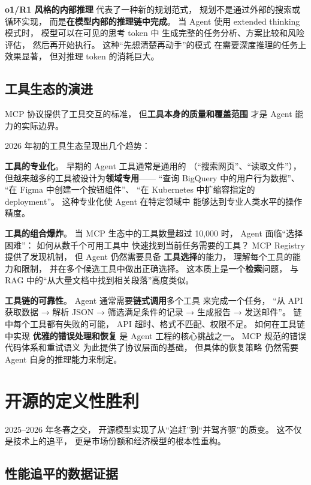 \textbf{o1/R1 风格的内部推理}
代表了一种新的规划范式，
规划不是通过外部的搜索或循环实现，
而是\textbf{在模型内部的推理链中完成}。
当 Agent 使用 extended thinking 模式时，
模型可以在可见的思考 token 中
生成完整的任务分析、方案比较和风险评估，
然后再开始执行。
这种“先想清楚再动手”的模式
在需要深度推理的任务上效果显著，
但对推理 token 的消耗巨大。

\subsection{工具生态的演进}

MCP 协议提供了工具交互的标准，
但\textbf{工具本身的质量和覆盖范围}
才是 Agent 能力的实际边界。

2026 年初的工具生态呈现出几个趋势：

\textbf{工具的专业化}。
早期的 Agent 工具通常是通用的
（“搜索网页”、“读取文件”），
但越来越多的工具被设计为\textbf{领域专用}——
“查询 BigQuery 中的用户行为数据”、
“在 Figma 中创建一个按钮组件”、
“在 Kubernetes 中扩缩容指定的 deployment”。
这种专业化使 Agent 在特定领域中
能够达到专业人类水平的操作精度。

\textbf{工具的组合爆炸}。
当 MCP 生态中的工具数量超过 10,000 时，
Agent 面临“选择困难”：
如何从数千个可用工具中
快速找到当前任务需要的工具？
MCP Registry 提供了发现机制，
但 Agent 仍然需要具备
\textbf{工具选择}的能力，
理解每个工具的能力和限制，
并在多个候选工具中做出正确选择。
这本质上是一个\textbf{检索}问题，
与 RAG 中的“从大量文档中找到相关段落”高度类似。

\textbf{工具链的可靠性}。
Agent 通常需要\textbf{链式调用}多个工具
来完成一个任务，
“从 API 获取数据 → 解析 JSON →
筛选满足条件的记录 → 生成报告 → 发送邮件”。
链中每个工具都有失败的可能，
API 超时、格式不匹配、权限不足。
如何在工具链中实现
\textbf{优雅的错误处理和恢复}
是 Agent 工程的核心挑战之一。
MCP 规范的错误代码体系和重试语义
为此提供了协议层面的基础，
但具体的恢复策略
仍然需要 Agent 自身的推理能力来制定。


\section{开源的定义性胜利}
\label{sec:open-source-victory}

2025--2026 年冬春之交，
开源模型实现了从“追赶”到“并驾齐驱”的质变。
这不仅是技术上的追平，
更是市场份额和经济模型的根本性重构。

\subsection{性能追平的数据证据}

